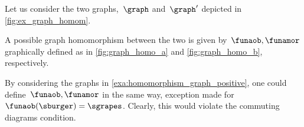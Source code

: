 \begin{example}
    \label{exa:homomorphism_graph_positive}
    Let us consider the two graphs,~$\graph$ and~$\graph'$ depicted in \cref{fig:ex_graph_homom}.
    \begin{figure*}[h]
        \centering
        \caption{Example of graphs for graph homomorphism.}
        \label{fig:ex_graph_homom}
    \end{figure*}

    \begin{marginfigure}
        \begin{center}
        \end{center}
        \caption{\label{fig:graph_homo_a}}
    \end{marginfigure}

    \begin{marginfigure}
        \begin{center}
        \end{center}
        \caption{\label{fig:graph_homo_b}}
    \end{marginfigure}
    A possible graph homomorphism between the two is given by~$\funaob,\funamor$ graphically defined as in \cref{fig:graph_homo_a} and \cref{fig:graph_homo_b}, respectively.

\end{example}

\begin{example}[Counterexample]
    By considering the graphs in \cref{exa:homomorphism_graph_positive}, one could define~$\funaob,\funamor$ in the same way, exception made for~$\funaob(\sburger)=\sgrapes$.
    Clearly, this would violate the commuting diagrams condition.
\end{example}

\publictodomessage
{}
